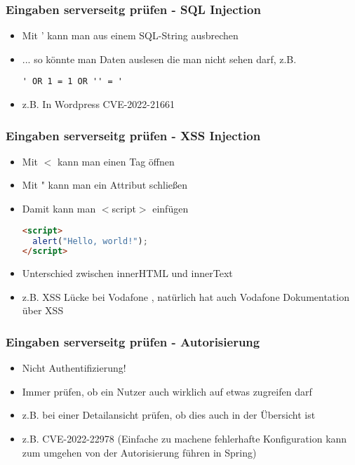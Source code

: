 \documentclass[ngerman2]{beamer}
\begin{document}
\begin{frame}[fragile]
\frametitle{Eingaben serverseitg prüfen - SQL Injection}
  \begin{itemize}
    \item Mit ' kann man aus einem SQL-String ausbrechen
		\item ... so könnte man Daten auslesen die man nicht sehen darf, z.B.
			\begin{lstlisting}
' OR 1 = 1 OR '' = '
			\end{lstlisting}
    \item z.B. In Wordpress CVE-2022-21661 \cite{CVE202221661}
  \end{itemize}
\end{frame}

\begin{frame}[fragile]
\frametitle{Eingaben serverseitg prüfen - XSS Injection}
  \begin{itemize}
		\item Mit $<$ kann man einen Tag öffnen
		\item Mit " kann man ein Attribut schließen
		\item Damit kann man $<$script$>$ einfügen\
			\begin{lstlisting}[language=HTML]
<script>
  alert("Hello, world!");
</script>
			\end{lstlisting}
    \item Unterschied zwischen innerHTML und innerText
    \item z.B. XSS Lücke bei Vodafone
      \cite{vodafonexssattack},
      natürlich hat auch Vodafone Dokumentation über XSS
      \cite{vodafonexssattackdoc}
  \end{itemize}
\end{frame}

\begin{frame}[fragile]
\frametitle{Eingaben serverseitg prüfen - Autorisierung}
  \begin{itemize}
    \item Nicht Authentifizierung!
		\item Immer prüfen, ob ein Nutzer auch wirklich auf etwas zugreifen darf
    \item z.B. bei einer Detailansicht prüfen, ob dies auch in der Übersicht ist
    \item z.B. CVE-2022-22978
      (Einfache zu machene fehlerhafte Konfiguration kann zum umgehen von der Autorisierung führen in Spring)
      \cite{CVE202222978}
  \end{itemize}
\end{frame}
\end{document}
